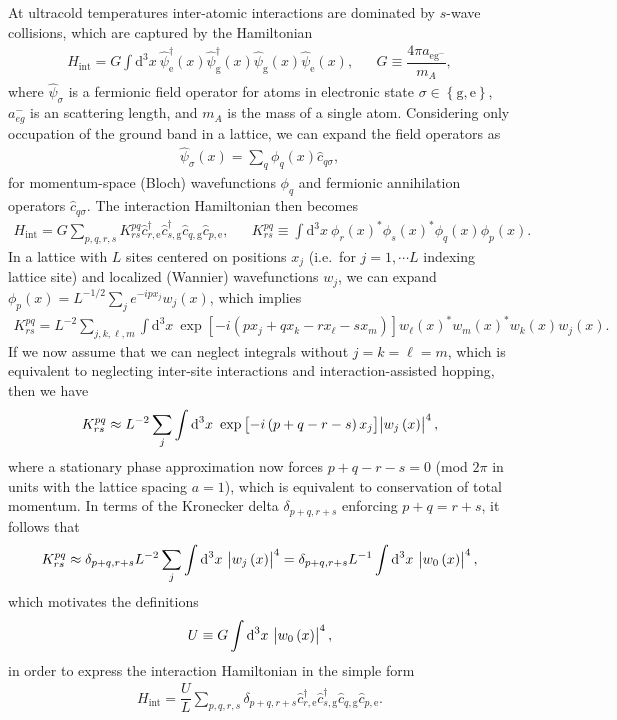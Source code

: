 \documentclass[aps,notitlepage,nofootinbib,11pt]{revtex4-1}
\renewcommand{\t}{\text} %
\newcommand{\f}[2]{\dfrac{#1}{#2}} %
\newcommand{\p}[1]{\left(#1\right)} %
\renewcommand{\sp}[1]{\left[#1\right]} %
\renewcommand{\set}[1]{\left\{#1\right\}} %
\renewcommand{\d}{\text{d}} %
\newcommand{\g}{\text{g}} %
\newcommand{\e}{\text{e}}
\newcommand{\1}{\hat{\mathds{1}}}
\begin{document}
At ultracold temperatures inter-atomic interactions are dominated by
$s$-wave collisions, which are captured by the Hamiltonian
\begin{align}
  H_{\t{int}} = G \int \d^3x~
  \hat\psi_\e^\dag\p{x} \hat\psi_\g^\dag\p{x}
  \hat\psi_\g\p{x} \hat\psi_\e\p{x},
  &&
  G \equiv \f{4\pi a_{\e\g^-}}{m_A},
\end{align}
where $\hat\psi_\sigma$ is a fermionic field operator for atoms in
electronic state $\sigma\in\set{\g,\e}$, $a_{eg}^-$ is an scattering
length, and $m_A$ is the mass of a single atom.  Considering only
occupation of the ground band in a lattice, we can expand the field
operators as
\begin{align}
  \hat\psi_\sigma\p{x} = \sum_q \phi_q\p{x} \hat c_{q\sigma},
\end{align}
for momentum-space (Bloch) wavefunctions $\phi_q$ and fermionic
annihilation operators $\hat c_{q\sigma}$.  The interaction
Hamiltonian then becomes
\begin{align}
  H_{\t{int}} = G \sum_{p,q,r,s} K^{pq}_{rs}
  \hat c_{r,\e}^\dag \hat c_{s,\g}^\dag \hat c_{q,\g} \hat c_{p,\e},
  &&
  K^{pq}_{rs} \equiv \int \d^3x~
  \phi_r\p{x}^* \phi_s\p{x}^* \phi_q\p{x} \phi_p\p{x}.
\end{align}
In a lattice with $L$ sites centered on positions $x_j$ (i.e.~for
$j=1,\cdots L$ indexing lattice site) and localized (Wannier)
wavefunctions $w_j$, we can expand
$\phi_p\p{x}=L^{-1/2}\sum_je^{-ipx_j}w_j\p{x}$, which implies
\begin{align}
  K^{pq}_{rs} = L^{-2} \sum_{j,k,\ell,m} \int \d^3x~
  \exp\sp{-i\p{px_j+qx_k-rx_\ell-sx_m}}
  w_\ell\p{x}^* w_m\p{x}^* w_k\p{x} w_j\p{x}.
\end{align}
If we now assume that we can neglect integrals without $j=k=\ell=m$,
which is equivalent to neglecting inter-site interactions and
interaction-assisted hopping, then we have
\begin{align}
  K^{pq}_{rs} \approx L^{-2} \sum_j \int \d^3x~
  \exp\sp{-i\p{p+q-r-s}x_j} \abs{w_j\p{x}}^4,
\end{align}
where a stationary phase approximation now forces $p+q-r-s=0$ (mod
$2\pi$ in units with the lattice spacing $a=1$), which is equivalent
to conservation of total momentum.  In terms of the Kronecker delta
$\delta_{p+q,r+s}$ enforcing $p+q=r+s$, it follows that
\begin{align}
  K^{pq}_{rs} \approx \delta_{p+q,r+s} L^{-2}
  \sum_j \int \d^3x~ \abs{w_j\p{x}}^4
  = \delta_{p+q,r+s} L^{-1} \int \d^3x~ \abs{w_0\p{x}}^4,
\end{align}
which motivates the definitions
\begin{align}
  U \equiv G \int \d^3x~ \abs{w_0\p{x}}^4,
\end{align}
in order to express the interaction Hamiltonian in the simple form
\begin{align}
  H_{\t{int}} = \f{U}{L} \sum_{p,q,r,s}
  \delta_{p+q,r+s} \hat c_{r,\e}^\dag \hat c_{s,\g}^\dag
  \hat c_{q,\g} \hat c_{p,\e}.
  \label{eq:H_int_full}
\end{align}
\end{document}
